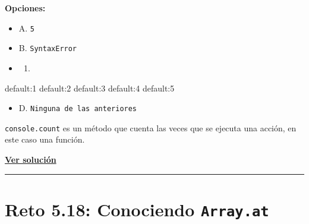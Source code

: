 \documentclass[
  letterpaper,
  DIV=11,
  numbers=noendperiod]{scrreprt}
\newenvironment{Shaded}{\begin{snugshade}}{\end{snugshade}}
\newcommand{\DecValTok}[1]{\textcolor[rgb]{0.68,0.00,0.00}{#1}}
\newcommand{\ImportTok}[1]{\textcolor[rgb]{0.00,0.46,0.62}{#1}}
\newcommand{\OperatorTok}[1]{\textcolor[rgb]{0.37,0.37,0.37}{#1}}
\providecommand{\tightlist}{%
  \setlength{\itemsep}{0pt}\setlength{\parskip}{0pt}}
\begin{document}
\textbf{Opciones:}

\begin{itemize}
\tightlist
\item
  A. \texttt{5}
\item
  B. \texttt{SyntaxError}
\item
  \begin{enumerate}
  \def\labelenumi{\Alph{enumi}.}
  \setcounter{enumi}{2}
  \tightlist
  \item
  \end{enumerate}
\end{itemize}

\begin{Shaded}
\begin{Highlighting}[]
\ImportTok{default}\OperatorTok{:}\DecValTok{1}
\ImportTok{default}\OperatorTok{:}\DecValTok{2}
\ImportTok{default}\OperatorTok{:}\DecValTok{3}
\ImportTok{default}\OperatorTok{:}\DecValTok{4}
\ImportTok{default}\OperatorTok{:}\DecValTok{5}
\end{Highlighting}
\end{Shaded}

\begin{itemize}
\tightlist
\item
  D. \texttt{Ninguna\ de\ las\ anteriores}
\end{itemize}

\begin{tcolorbox}[enhanced jigsaw, left=2mm, toprule=.15mm, leftrule=.75mm, breakable, colback=white, coltitle=black, bottomtitle=1mm, arc=.35mm, rightrule=.15mm, colframe=quarto-callout-tip-color-frame, opacitybacktitle=0.6, toptitle=1mm, opacityback=0, titlerule=0mm, title=\textcolor{quarto-callout-tip-color}{\faLightbulb}\hspace{0.5em}{Pista}, bottomrule=.15mm, colbacktitle=quarto-callout-tip-color!10!white]

\texttt{console.count} es un método que cuenta las veces que se ejecuta
una acción, en este caso una función.

\end{tcolorbox}

\textbf{\hyperref[sec-sol-cap5-reto17]{Ver solución}}

\begin{center}\rule{0.5\linewidth}{0.5pt}\end{center}

\section{\texorpdfstring{Reto 5.18: Conociendo
\texttt{Array.at}}{Reto 5.18: Conociendo Array.at}}\label{sec-cap5-reto18}
\end{document}
